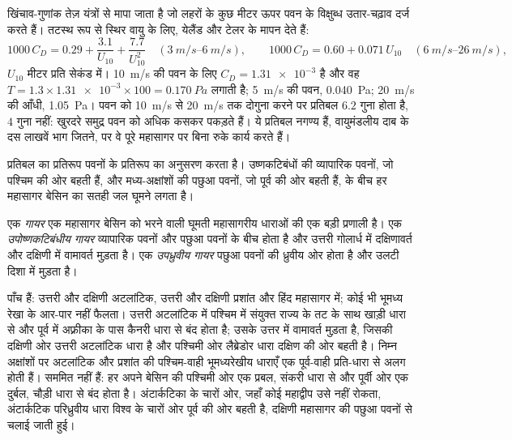खिंचाव-गुणांक तेज़ यंत्रों से मापा जाता है जो लहरों के कुछ मीटर ऊपर पवन के विक्षुब्ध उतार-चढ़ाव दर्ज करते हैं। तटस्थ रूप से स्थिर वायु के लिए, येलैंड और टेलर के मापन देते हैं:
\[
  1000\,C_D = 0.29 + \frac{3.1}{U_{10}} + \frac{7.7}{U_{10}^2}
  \quad (\qtyrange{3}{6}{m/s}),
  \qquad
  1000\,C_D = 0.60 + 0.071\,U_{10}
  \quad (\qtyrange{6}{26}{m/s}),
\]
$U_{10}$ मीटर प्रति सेकंड में। \qty{10}{m/s} की पवन के लिए $C_D =
\num{1.31e-3}$ है और वह $T = 1.3 \times \num{1.31e-3} \times 100 =
\qty{0.170}{Pa}$ लगाती है; \qty{5}{m/s} की पवन, \qty{0.040}{Pa}; \qty{20}{m/s} की आँधी, \qty{1.05}{Pa}। पवन को \qty{10}{m/s} से \qty{20}{m/s} तक दोगुना करने पर
प्रतिबल $6.2$ गुना होता है, $4$ गुना नहीं: खुरदरे समुद्र पवन को अधिक कसकर पकड़ते हैं। ये प्रतिबल नगण्य हैं, वायुमंडलीय दाब के दस लाखवें भाग जितने, पर वे पूरे महासागर पर बिना रुके कार्य करते हैं।

प्रतिबल का प्रतिरूप पवनों के प्रतिरूप का अनुसरण करता है। उष्णकटिबंधों की व्यापारिक पवनों, जो पश्चिम की ओर बहती हैं, और मध्य-अक्षांशों की पछुआ पवनों, जो पूर्व की ओर बहती हैं, के बीच हर महासागर बेसिन का सतही जल घूमने लगता है।

\begin{definition}\label{def:b1:ocean-circulation:gyre}
एक \emph{गायर} एक महासागर बेसिन को भरने वाली घूमती महासागरीय धाराओं की एक बड़ी प्रणाली है। एक \emph{उपोष्णकटिबंधीय गायर} व्यापारिक पवनों और पछुआ पवनों के बीच होता है और उत्तरी गोलार्ध में दक्षिणावर्त और दक्षिणी में वामावर्त मुड़ता है। एक \emph{उपध्रुवीय गायर} पछुआ पवनों की ध्रुवीय ओर होता है और उलटी दिशा में मुड़ता है।
\end{definition}

पाँच  हैं: उत्तरी और दक्षिणी अटलांटिक, उत्तरी और दक्षिणी प्रशांत और हिंद महासागर में; कोई भी भूमध्य रेखा के आर-पार नहीं फैलता। उत्तरी अटलांटिक में  पश्चिम में संयुक्त राज्य के तट के साथ खाड़ी धारा से और पूर्व में अफ़्रीका के पास कैनरी धारा से बंद होता है; उसके उत्तर में  वामावर्त मुड़ता है, जिसकी दक्षिणी ओर उत्तरी अटलांटिक धारा है और पश्चिमी ओर लैब्रेडोर धारा दक्षिण की ओर बहती है। निम्न अक्षांशों पर अटलांटिक और प्रशांत की पश्चिम-वाही भूमध्यरेखीय धाराएँ एक पूर्व-वाही प्रति-धारा से अलग होती हैं।  सममित नहीं हैं: हर  अपने बेसिन की पश्चिमी ओर एक प्रबल, संकरी धारा से और पूर्वी ओर एक दुर्बल, चौड़ी धारा से बंद होता है। अंटार्कटिका के चारों ओर, जहाँ कोई महाद्वीप उसे नहीं रोकता, अंटार्कटिक परिध्रुवीय धारा विश्व के चारों ओर पूर्व की ओर बहती है, दक्षिणी महासागर की पछुआ पवनों से चलाई जाती हुई।

